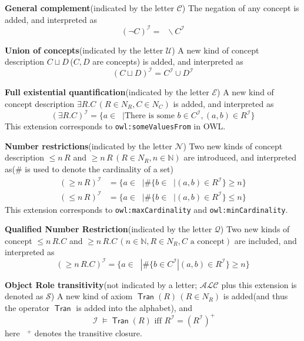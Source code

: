 \documentclass{article}
\DeclareMathOperator{\deno}{\mathcal{I}}
\DeclareMathOperator{\dm}{\Delta^{\deno}}
\DeclareMathOperator{\tran}{\textsf{Tran}}
\begin{document}
\textbf{General complement}(indicated by the letter $\mathcal{C}$)\newline
The negation of any concept is added, and interpreted as 
\[
(\neg C)^{\deno} = \dm \backslash C^{\deno}
\]

\textbf{Union of concepts}(indicated by the letter $\mathcal{U}$)\newline
A new kind of concept description $C \sqcup D$\,($C,D$ are concepts) is added, and interpreted as 
\[
(C \sqcup D)^{\deno} = C^{\deno} \cup D^{\deno}
\]

\textbf{Full existential quantification}(indicated by the letter $\mathcal{E}$)\newline
A new kind of concept description $\exists R.C\,(R \in N_R, C \in N_C)$ is added, and interpreted as
\[
(\exists R.C)^{\deno} = \{a \in \dm | \text{There is some }b \in C^{\deno}, (a,b) \in R^{\deno}\}
\]
This extension corresponds to \texttt{owl:someValuesFrom} in OWL.\newline

\textbf{Number restrictions}(indicated by the letter $\mathcal{N}$)\newline
Two new kinds of concept description $\leqslant n\,R$ and $\geqslant n\,R\,(R \in N_R, n \in \mathbb{N})$ are introduced, and interpreted as($\#$ is used to denote the cardinality of a set)
\begin{align*}
(\geqslant n\,R)^{\deno} &= \{a \in \dm | \#\{b \in \dm | (a,b) \in R^{\deno}\} \ge n\}\\
(\leqslant n\,R)^{\deno} &= \{a \in \dm |  \#\{b \in \dm | (a,b) \in R^{\deno}\} \le n\}
\end{align*}
This extension corresponds to \texttt{owl:maxCardinality} and \texttt{owl:minCardinality}. \newline

\textbf{Qualified Number Restriction}(indicated by the letter $\mathcal{Q}$)\newline
Two new kinds of concept $\leqslant n \,R.C$ and $\geqslant n\,R.C\,(n \in \mathbb{N}, R\in N_R, C \text{ a concept})$ are included, and interpreted as 
\[
(\geqslant n\,R.C)^{\deno} = \{ a \in \dm | \#\{b \in C^{\deno} | (a,b) \in R^{\deno}\} \ge n\}
\]

\textbf{Object Role transitivity}(not indicated by a letter; $\mathcal{ALC}$ plus this extension is denoted as $\mathcal{S}$)\newline
A new kind of axiom $\tran(R)\,(R \in N_R)$ is added(and thus the operator $\tran$ is added into the alphabet), and 
\[
\deno \vDash \tran(R) \text{ iff } R^{\deno} = \left(R^{\deno}\right)^{+}
\]
here $\phantom{a}^{+}$ denotes the transitive closure. \newline
\end{document}
